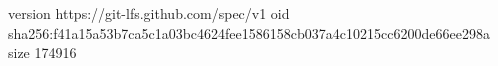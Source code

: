 version https://git-lfs.github.com/spec/v1
oid sha256:f41a15a53b7ca5c1a03bc4624fee1586158cb037a4c10215cc6200de66ee298a
size 174916
